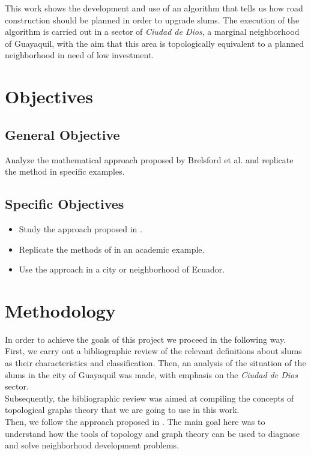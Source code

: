 \documentclass[10pt]{article}
\begin{document}
This work shows the development and use of an algorithm that tells us how road construction should be planned in order to upgrade slums. The execution of the algorithm is carried out in a sector of \emph{Ciudad de Dios}, a marginal neighborhood of Guayaquil, with the aim that this area is topologically equivalent to a planned neighborhood in need of low investment.\\


\section{Objectives}
\subsection{General Objective}
Analyze the mathematical approach proposed by Brelsford et al. \cite{bre} and replicate the method in specific examples.


\subsection{Specific Objectives}
\begin{itemize}
    \item Study the approach proposed in \cite{bre}.
    \item Replicate the methods of \cite{bre} in an academic example.
    \item Use the approach \cite{bre} in a city or neighborhood of Ecuador.
\end{itemize}


\section{Methodology}
In order to achieve the goals of this project we proceed in the following way.\\

First, we carry out a bibliographic review of the relevant definitions about slums as their characteristics and classification. Then, an analysis of the situation of the slums in the city of Guayaquil was made, with emphasis on the \emph{Ciudad de Dios} sector.\\

Subsequently, the bibliographic review was aimed at compiling the concepts of topological graphs theory that we are going to use in this work.\\

Then, we follow the approach proposed in \cite{bre}. The main goal here was to understand how the tools of topology and graph theory can be used to diagnose and solve neighborhood development problems.\\
\end{document}

